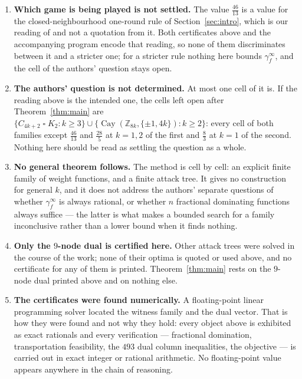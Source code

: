 \documentclass[11pt]{amsart}
\theoremstyle{remark}
\newcommand{\fed}{\gamma_f^{\infty}}
\newcommand{\Z}{\mathbb{Z}}
\newcommand{\Cay}{\operatorname{Cay}}
\begin{document}
\begin{enumerate}
\item \textbf{Which game is being played is not settled.} The value
  $\tfrac{46}{13}$ is a value for the closed-neighbourhood one-round rule of
  Section~\ref{sec:intro}, which is our reading of \cite{FED} and not a
  quotation from it. Both certificates above and the accompanying program encode
  that reading, so none of them discriminates between it and a stricter one; for
  a stricter rule nothing here bounds $\fed$, and the cell of the authors'
  question stays open.
\item \textbf{The authors' question is not determined.} At most one cell of it
  is. If the reading above is the intended one, the cells left open after
  Theorem~\ref{thm:main} are
  $\{C_{4k+2}\mathbin{\square}K_2 : k\ge3\}\cup
   \{\Cay(\Z_{8k},\{\pm1,4k\}) : k\ge2\}$: every cell of both families except
  $\tfrac{46}{13}$ and $\tfrac{28}{5}$ at $k=1,2$ of the first and $\tfrac83$ at
  $k=1$ of the second. Nothing here should be read as settling the question as a
  whole.
\item \textbf{No general theorem follows.} The method is cell by cell: an
  explicit finite family of weight functions, and a finite attack tree. It
  gives no construction for general $k$, and it does not address the authors'
  separate questions of whether $\fed$ is always rational, or whether $n$
  fractional dominating functions always suffice --- the latter is what makes a
  bounded search for a family inconclusive rather than a lower bound when it
  finds nothing.
\item \textbf{Only the $9$-node dual is certified here.} Other attack trees were
  solved in the course of the work; none of their optima is quoted or used
  above, and no certificate for any of them is printed. Theorem~\ref{thm:main}
  rests on the $9$-node dual printed above and on nothing else.
\item \textbf{The certificates were found numerically.} A floating-point
  linear programming solver located the witness family and the dual vector.
  That is how they were found and not why they hold: every object above is
  exhibited as exact rationals and every verification --- fractional
  domination, transportation feasibility, the $493$ dual column inequalities,
  the objective --- is carried out in exact integer or rational arithmetic. No
  floating-point value appears anywhere in the chain of reasoning.
\end{enumerate}
\end{document}
